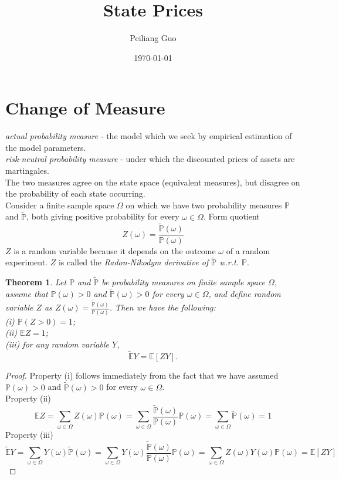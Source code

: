 \documentclass[a4paper]{article}
\title{State Prices}
\author{Peiliang Guo}
\date{\today}
\newtheorem{thm}{Theorem}
\theoremstyle{definition}
\begin{document}
\maketitle
\section{Change of Measure}
\textit{actual probability measure} - the model which we seek by empirical estimation of the model parameters. \\
\textit{risk-neutral probability measure} - under which the discounted prices of assets are martingales. \\
The two measures agree on the state space (equivalent measures), but disagree on the probability of each state occurring. \\
Consider a finite sample space $\Omega$ on which we have two probability measures $\mathbb{P}$ and $\tilde{\mathbb{P}}$, both giving positive probability for every $\omega\in\Omega$. Form quotient 
$$Z(\omega) = \frac{\tilde{\mathbb{P}}(\omega)}{\mathbb{P}(\omega)}$$
$Z$ is a random variable because it depends on the outcome $\omega$ of a random experiment. $Z$ is called the \textit{Radon-Nikodym derivative of $\tilde{\mathbb{P}}$ w.r.t. $\mathbb{P}$}.
\begin{thm}
Let $\mathbb{P}$ and $\tilde{\mathbb{P}}$ be probability measures on finite sample space $\Omega$, assume that $\mathbb{P}(\omega)>0$ and $\tilde{\mathbb{P}}(\omega)>0$ for every $\omega\in\Omega$, and define random variable $Z$ as $Z(\omega) = \frac{\tilde{\mathbb{P}}(\omega)}{\mathbb{P}(\omega)}$. Then we have the following:\\
(i) $\mathbb{P}(Z>0) = 1$;\\
(ii) $\mathbb{E}Z = 1$;\\
(iii) for any random variable $Y$, 
$$\tilde{\mathbb{E}}Y = \mathbb{E}[ZY].$$
\end{thm} 
\begin{proof}
Property (i) follows immediately from the fact that we have assumed $\mathbb{P}(\omega)>0$ and $\tilde{\mathbb{P}}(\omega)>0$ for every $\omega \in \Omega$. \\
Property (ii) 
$$\mathbb{E}Z = \sum_{\omega\in\Omega}Z(\omega)\mathbb{P}(\omega) = \sum_{\omega\in\Omega} \frac{\tilde{\mathbb{P}}(\omega)}{\mathbb{P}(\omega)}\mathbb{P}(\omega)  = \sum_{\omega\in\Omega}\tilde{\mathbb{P}}(\omega) = 1$$
Property (iii)
$$\tilde{\mathbb{E}}Y = \sum_{\omega\in\Omega}Y(\omega)\tilde{\mathbb{P}}(\omega) = \sum_{\omega\in\Omega}Y(\omega)\frac{\tilde{\mathbb{P}}(\omega)}{\mathbb{P}(\omega)}\mathbb{P}(\omega) = \sum_{\omega\in\Omega}Z(\omega)Y(\omega)\mathbb{P}(\omega) = \mathbb{E}[ZY]$$
\end{proof}
\end{document}

